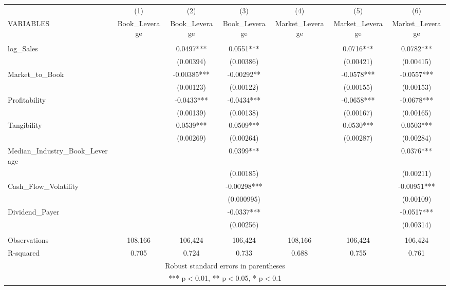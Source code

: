 \begin{tabular}{lcccccc} \hline
 & (1) & (2) & (3) & (4) & (5) & (6) \\
VARIABLES & Book\_Leverage & Book\_Leverage & Book\_Leverage & Market\_Leverage & Market\_Leverage & Market\_Leverage \\ \hline
 &  &  &  &  &  &  \\
log\_Sales &  & 0.0497*** & 0.0551*** &  & 0.0716*** & 0.0782*** \\
 &  & (0.00394) & (0.00386) &  & (0.00421) & (0.00415) \\
Market\_to\_Book &  & -0.00385*** & -0.00292** &  & -0.0578*** & -0.0557*** \\
 &  & (0.00123) & (0.00122) &  & (0.00155) & (0.00153) \\
Profitability &  & -0.0433*** & -0.0434*** &  & -0.0658*** & -0.0678*** \\
 &  & (0.00139) & (0.00138) &  & (0.00167) & (0.00165) \\
Tangibility &  & 0.0539*** & 0.0509*** &  & 0.0530*** & 0.0503*** \\
 &  & (0.00269) & (0.00264) &  & (0.00287) & (0.00284) \\
Median\_Industry\_Book\_Leverage &  &  & 0.0399*** &  &  & 0.0376*** \\
 &  &  & (0.00185) &  &  & (0.00211) \\
Cash\_Flow\_Volatility &  &  & -0.00298*** &  &  & -0.00951*** \\
 &  &  & (0.000995) &  &  & (0.00109) \\
Dividend\_Payer &  &  & -0.0337*** &  &  & -0.0517*** \\
 &  &  & (0.00256) &  &  & (0.00314) \\
 &  &  &  &  &  &  \\
Observations & 108,166 & 106,424 & 106,424 & 108,166 & 106,424 & 106,424 \\
 R-squared & 0.705 & 0.724 & 0.733 & 0.688 & 0.755 & 0.761 \\ \hline
\multicolumn{7}{c}{ Robust standard errors in parentheses} \\
\multicolumn{7}{c}{ *** p$<$0.01, ** p$<$0.05, * p$<$0.1} \\
\end{tabular}
